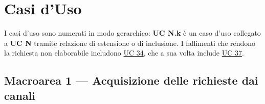 \section{Casi d'Uso}



I casi d'uso sono numerati in modo gerarchico: \textbf{UC N.k} è un caso d'uso collegato a \textbf{UC N} tramite relazione di estensione o di inclusione. I fallimenti che rendono la richiesta non elaborabile includono \hyperref[uc:34]{UC 34}, che a sua volta include \hyperref[uc:37]{UC 37}.

\subsection{Macroarea 1 --- Acquisizione delle richieste dai canali}

